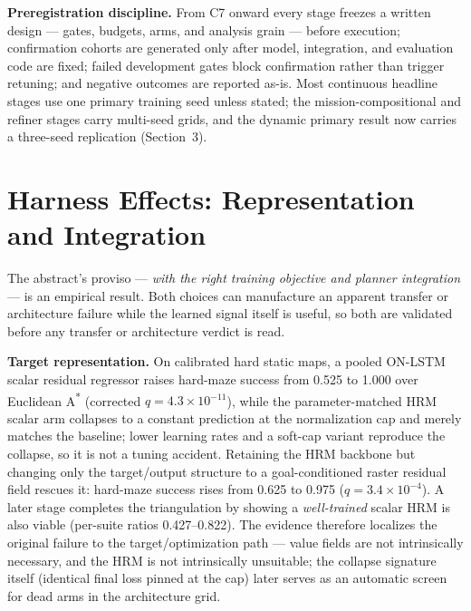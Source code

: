 \documentclass[11pt,letterpaper]{article}
\newcommand{\stage}[1]{\textsc{#1}}
\begin{document}
\textbf{Preregistration discipline.} From \stage{C7} onward every stage freezes a written design --- gates, budgets, arms, and analysis grain --- before execution; confirmation cohorts are generated only after model, integration, and evaluation code are fixed; failed development gates block confirmation rather than trigger retuning; and negative outcomes are reported as-is. Most continuous headline stages use one primary training seed unless stated; the mission-compositional and refiner stages carry multi-seed grids, and the dynamic primary result now carries a three-seed replication (Section~3).

\section{Harness Effects: Representation and Integration}

The abstract's proviso --- \emph{with the right training objective and planner integration} --- is an empirical result. Both choices can manufacture an apparent transfer or architecture failure while the learned signal itself is useful, so both are validated before any transfer or architecture verdict is read.

\textbf{Target representation.} On calibrated hard static maps, a pooled ON-LSTM scalar residual regressor raises hard-maze success from 0.525 to 1.000 over Euclidean A\textsuperscript{*} (corrected $q{=}4.3{\times}10^{-11}$), while the parameter-matched HRM scalar arm collapses to a constant prediction at the normalization cap and merely matches the baseline; lower learning rates and a soft-cap variant reproduce the collapse, so it is not a tuning accident. Retaining the HRM backbone but changing only the target/output structure to a goal-conditioned raster residual field rescues it: hard-maze success rises from 0.625 to 0.975 ($q{=}3.4{\times}10^{-4}$). A later stage completes the triangulation by showing a \emph{well-trained} scalar HRM is also viable (per-suite ratios 0.427--0.822). The evidence therefore localizes the original failure to the target/optimization path --- value fields are not intrinsically necessary, and the HRM is not intrinsically unsuitable; the collapse signature itself (identical final loss pinned at the cap) later serves as an automatic screen for dead arms in the architecture grid.
\end{document}
